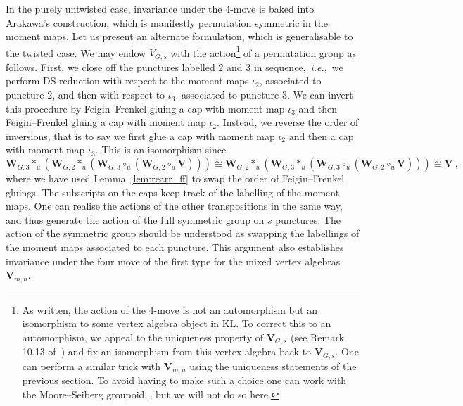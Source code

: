 \documentclass[a4paper]{article}
\def \ie{{\it i.e.}}
\def \KL{\mathrm{KL}}
\def\W{\mathbf{W}}
\def\V{\mathbf{V}}
\begin{document}
In the purely untwisted case, invariance under the $4$-move is baked into Arakawa's construction, which is manifestly permutation symmetric in the moment maps. Let us present an alternate formulation, which is generalisable to the twisted case. We may endow $V_{G,s}$ with the action\footnote{As written, the action of the $4$-move is not an automorphism but an isomorphism to some vertex algebra object in $\KL$. To correct this to an automorphism, we appeal to the uniqueness property of $\V_{G,s}$ (see Remark 10.13 of~\cite{Arakawa:2018egx}) and fix an isomorphism from this vertex algebra back to $\V_{G,s}$. One can perform a similar trick with $\V_{m,n}$ using the uniqueness statements of the previous section. To avoid having to make such a choice one can work with the Moore--Seiberg groupoid~\cite{Moore:1104178762}, but we will not do so here.} of a permutation group as follows. First, we close off the punctures labelled $2$ and $3$ in sequence,~\ie,~we perform DS reduction with respect to the moment maps $\iota_2$, associated to puncture $2$, and then with respect to $\iota_3$, associated to puncture $3$. We can invert this procedure by Feigin--Frenkel gluing a cap with moment map $\iota_3$ and then Feigin--Frenkel gluing a cap with moment map $\iota_2$. Instead, we reverse the order of inversions, that is to say we first glue a cap with moment map $\iota_2$ and then a cap with moment map $\iota_3$. This is an isomorphism since
\begin{equation}
    \W_{G,3}\ast_u(\W_{G,2}\ast_u(\W_{G,3}\circ_u(\W_{G,2}\circ_u \V))) \cong \W_{G,2} \ast_u (\W_{G,3}\ast_u   (\W_{G,3}\circ_u(\W_{G,2}\circ_u \V)))\cong \V~,
\end{equation}
where we have used Lemma~\ref{lem:rearr_ff} to swap the order of Feigin--Frenkel gluings. The subscripts on the caps keep track of the labelling of the moment maps. One can realise the actions of the other transpositions in the same way, and thus generate the action of the full symmetric group on $s$ punctures. The action of the symmetric group should be understood as swapping the labellings of the moment maps associated to each puncture. This argument also establishes invariance under the four move of the first type for the mixed vertex algebras $\V_{m,n}$.
\end{document}
